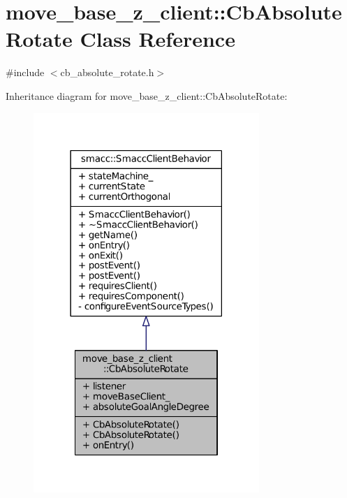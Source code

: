 \hypertarget{classmove__base__z__client_1_1CbAbsoluteRotate}{}\section{move\+\_\+base\+\_\+z\+\_\+client\+:\+:Cb\+Absolute\+Rotate Class Reference}
\label{classmove__base__z__client_1_1CbAbsoluteRotate}


{\ttfamily \#include $<$cb\+\_\+absolute\+\_\+rotate.\+h$>$}



Inheritance diagram for move\+\_\+base\+\_\+z\+\_\+client\+:\+:Cb\+Absolute\+Rotate\+:
\nopagebreak
\begin{figure}[H]
\begin{center}
\leavevmode
\includegraphics[width=242pt]{classmove__base__z__client_1_1CbAbsoluteRotate__inherit__graph}
\end{center}
\end{figure}


